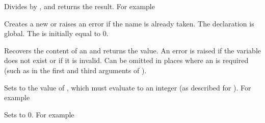 \documentclass[oneside]{book}
\let\tn=\cs
\begin{document}
\begin{function}{\IntMathDiv}
\begin{syntax}
  
\end{syntax}
Divides  by ,
and returns the result. For example
\begin{demo}
\end{demo}
\end{function}

\begin{function}{\IntNew}
\begin{syntax}
 
\end{syntax}
Creates a new  or raises an error if the name is
already taken. The declaration is global. The  is
initially equal to $0$.
\end{function}

\begin{function}{\IntUse}
\begin{syntax}
 
\end{syntax}
Recovers the content of an  and returns the value.
An error is raised if the variable does
not exist or if it is invalid. Can be omitted in places where an
 is required (such as in the first and third arguments
of ).%
\end{function}

\begin{function}{\IntSet}
\begin{syntax}
  
\end{syntax}
Sets  to the value of ,
which must evaluate to an integer (as described for ).
For example
\begin{demo}
\IntSet{}
\IntUse\lTmpaInt
\end{demo}
\end{function}

\begin{function}{\IntZero}
\begin{syntax}
 
\end{syntax}
Sets  to $0$. For example
\begin{demo}
\IntSet{}
\IntZero\lTmpaInt
\IntUse\lTmpaInt
\end{demo}
\end{function}
\end{document}
